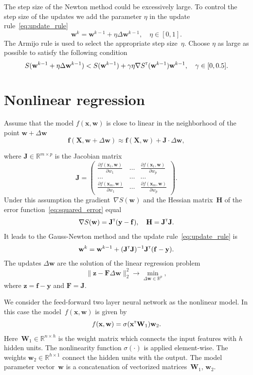 \documentclass[a4paper,12pt]{article}
\theoremstyle{plain} %
\theoremstyle{definition} %
\theoremstyle{remark} %
\newcommand{\bw}{\mathbf{w}}
\newcommand{\by}{\mathbf{y}}
\newcommand{\bx}{\mathbf{x}}
\newcommand{\bz}{\mathbf{z}}
\newcommand{\bJ}{\mathbf{J}}
\newcommand{\bbR}{\mathbb{R}}
\newcommand{\bW}{\mathbf{W}}
\newcommand{\bH}{\mathbf{H}}
\newcommand{\bF}{\mathbf{F}}
\newcommand{\bX}{\mathbf{X}}
\newcommand{\T}{{\text{\tiny\sffamily\upshape\mdseries T}}}
\begin{document}
The step size of the Newton method could be excessively large. To control the step size of the updates we add the parameter $\eta$ in the update rule~\eqref{eq:update_rule}
\[
\bw^k = \bw^{k - 1} + \eta \Delta \bw^{k - 1}, \quad \eta \in [0, 1].
\]
The Armijo rule is used to select the appropriate step size~$\eta$. Choose $\eta$ as large as possible to satisfy the following condition
\[
S(\bw^{k - 1} + \eta \Delta \bw^{k - 1}) < S(\bw^{k - 1}) + \gamma \eta \nabla S^{\T}(\bw^{k-1})\bw^{k - 1}, \quad \gamma \in [0, 0.5].
\]

	\section*{Nonlinear regression}
	Assume that the model $f(\bx , \bw)$ is close to linear in the neighborhood of the point $\bw + \Delta \bw$
\[
\mathbf{f}(\bX , \bw + \Delta \bw) \approx \mathbf{f}(\bX , \bw) + \bJ \cdot \Delta  \bw,
\]

where $\mathbf{J} \in \bbR^{m \times p}$ is the Jacobian matrix
\begin{equation}
\bJ = 
\begin{pmatrix}
\frac{\partial f(\bx_1 , \bw)}{\partial w_1} & \dots & 
\frac{\partial f(\bx_1 , \bw)}{\partial w_p} \\
\dots & \dots & \dots \\
\frac{\partial f(\bx_m , \bw)}{\partial w_1} & \dots & 
\frac{\partial f(\bx_m , \bw)}{\partial w_p}
\end{pmatrix}.
\end{equation}
Under this assumption the gradient~$\nabla S(\bw)$ and the Hessian matrix~$\bH$ of the error function~\eqref{eq:squared_error} equal
\begin{equation}
\nabla S(\bw) = \bJ^{\T} (\by - \mathbf{f}), \quad \bH = \bJ^{\T} \bJ.
\label{eq:nonlin_reg_deriv}
\end{equation}
It leads to the Gauss-Newton method and the update rule~\eqref{eq:update_rule} is 
\[
\bw^k = \bw^{k - 1} + (\bJ^{\T} \bJ)^{-1}\bJ^{\T}(\mathbf{f} - \by).
\]
The updates $\Delta \bw$ are the solution of the linear regression problem
\begin{equation}
\| \bz - \bF \Delta \bw \|_2^2 \rightarrow \min_{\Delta \bw \in \bbR^{p}},
\label{eq:lin_reg_nonlin_reg}
\end{equation}
where $\bz = \mathbf{f} - \by$ and $\bF = \bJ$.

We consider the feed-forward two layer neural network as the nonlinear model. In this case the model~$f(\bx, \bw)$ is given by
\[
f(\bx, \bw) = \sigma(\bx^{\T} \bW_1) \bw_2.
\]
Here~$\bW_1 \in \bbR^{n \times h}$ is the weight matrix which connects the input features with $h$ hidden units. The nonlinearity function $\sigma(\cdot)$ is applied element-wise. The weights $\bw_2 \in \bbR^{h \times 1}$ connect the hidden units with the output. 
The model parameter vector~$\bw$ is a concatenation of vectorized matrices~$\bW_1$, $\bw_2$.
\end{document}
